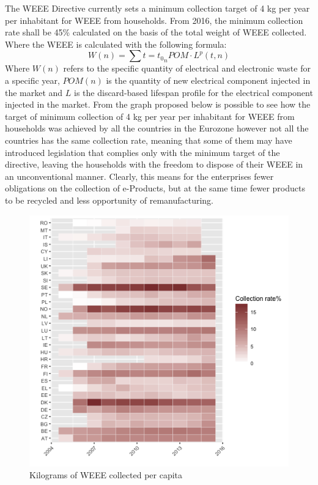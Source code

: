 \begin{doublespace}
  The WEEE Directive currently sets a minimum collection target of 4 kg per year per inhabitant for WEEE from households. From 2016, the minimum collection rate shall be 45\% calculated on the basis of the total weight of WEEE collected. Where the WEEE is calculated with the following formula:
  $$
  W (n) = \sum{t = t_0}_{n} POM \cdot L^p(t,n)
  $$
   Where $W(n)$ refers to the specific quantity of electrical and electronic waste for a specific year, $POM(n)$ is the quantity of new electrical component injected in the market and $L$ is the discard-based lifespan profile for the electrical component injected in the market. From the graph proposed below is possible to see how the target of minimum collection of 4 kg per year per inhabitant for WEEE from households was achieved by all the countries in the Eurozone however not all the countries has the same collection rate, meaning that some of them may have introduced legislation that complies only with the minimum target of the directive, leaving the households with the freedom to dispose of their WEEE in an unconventional manner. Clearly, this means for the enterprises fewer obligations on the collection of e-Products, but at the same time fewer products to be recycled and less opportunity of remanufacturing.

  \begin{figure}
  \centering
  \includegraphics[width=0.8\linewidth]{Images/heatmap.png}
  \caption{Kilograms of WEEE collected per capita}
  \end{figure}


\end{doublespace}
